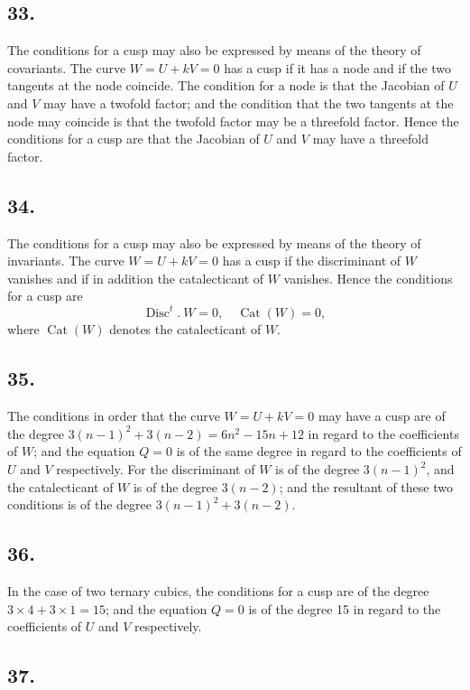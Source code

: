 \documentclass[11pt,a4paper]{article}
\theoremstyle{definition}
\DeclareMathOperator{\Disc}{Disc}
\DeclareMathOperator{\Cat}{Cat}
\begin{document}
\subsection*{33.}

The conditions for a cusp may also be expressed by means of the theory of covariants.
The curve $W = U + kV = 0$ has a cusp if it has a node and if the two tangents at the
node coincide. The condition for a node is that the Jacobian of $U$ and $V$ may have a
twofold factor; and the condition that the two tangents at the node may coincide is that
the twofold factor may be a threefold factor. Hence the conditions for a cusp are that
the Jacobian of $U$ and $V$ may have a threefold factor.

\subsection*{34.}

The conditions for a cusp may also be expressed by means of the theory of invariants.
The curve $W = U + kV = 0$ has a cusp if the discriminant of $W$ vanishes and if in
addition the catalecticant of $W$ vanishes. Hence the conditions for a cusp are
\[
\Disc^{t}.\ W = 0,\quad \Cat(W) = 0,
\]
where $\Cat(W)$ denotes the catalecticant of $W$.

\newpage
\subsection*{35.}

The conditions in order that the curve $W = U + kV = 0$ may have a cusp are of the
degree $3(n - 1)^{2} + 3(n - 2) = 6n^{2} - 15n + 12$ in regard to the coefficients of $W$; and the
equation $Q = 0$ is of the same degree in regard to the coefficients of $U$ and $V$ respectively.
For the discriminant of $W$ is of the degree $3(n - 1)^{2}$, and the catalecticant of $W$ is of the
degree $3(n - 2)$; and the resultant of these two conditions is of the degree $3(n - 1)^{2} + 3(n - 2)$.

\subsection*{36.}

In the case of two ternary cubics, the conditions for a cusp are of the degree
$3 \times 4 + 3 \times 1 = 15$; and the equation $Q = 0$ is of the degree 15 in regard to the coefficients
of $U$ and $V$ respectively.

\subsection*{37.}
\end{document}
